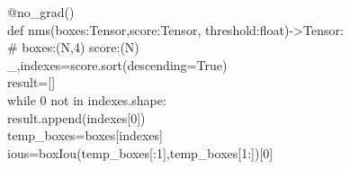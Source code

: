 \begin{frame}
    \large
    @\textcolor{vscodeclass}{no\_grad}\textcolor{vscodebracket}{()}\\
    \vspace{0.2em}
    \textcolor{vscodedef}{def}  \textcolor{vscodefuncation}{nms}\textcolor{vscodebracket}{(}\textcolor{vscodeparameter}{boxes}:\textcolor{vscodeclass}{Tensor},\textcolor{vscodeparameter}{score}:\textcolor{vscodeclass}{Tensor}, \textcolor{vscodeparameter}{threshold}:\textcolor{vscodeclass}{float}\textcolor{vscodebracket}{)}->\textcolor{vscodeclass}{Tensor}:\\
    \vspace{0.2em}
    \qquad\textcolor{vscodecomment}{\# boxes:(N,4) score:(N)}\\
    \vspace{0.2em}
    \qquad\textcolor{vscodeparameter}{\_},\textcolor{vscodeparameter}{indexes}=\textcolor{vscodeparameter}{score}.\textcolor{vscodefuncation}{sort}\textcolor{vscodebracket}{(}\textcolor{vscodeparameter}{descending}=\textcolor{vscodedef}{True}\textcolor{vscodebracket}{)}\\
    \vspace{0.2em}
    \qquad\textcolor{vscodeparameter}{result}=\textcolor{vscodebracket}{[]}\\
    \vspace{0.2em}
    \qquad\textcolor{vscodereturn}{while} \textcolor{vscodecomment}{0} \textcolor{vscodedef}{not in }\textcolor{vscodeparameter}{indexes}.\textcolor{vscodeparameter}{shape}:\\
    \vspace{0.2em}
    \qquad\qquad\textcolor{vscodeparameter}{result}.\textcolor{vscodefuncation}{append}\textcolor{vscodebracket}{(}\textcolor{vscodeparameter}{indexes}\textcolor{vscodecomment}{[0]}\textcolor{vscodebracket}{)}\\
    \vspace{0.2em}
    \qquad\qquad\textcolor{vscodeparameter}{temp\_boxes}=\textcolor{vscodeparameter}{boxes}\textcolor{vscodecomment}{[}\textcolor{vscodeparameter}{indexes}\textcolor{vscodecomment}{]}\\
    \vspace{0.2em}
    \qquad\qquad\textcolor{vscodeparameter}{ious}=\textcolor{vscodefuncation}{boxIou}\textcolor{vscodebracket}{(}\textcolor{vscodeparameter}{temp\_boxes}\textcolor{vscodecomment}{[}:\textcolor{vscodecomment}{1]},\textcolor{vscodeparameter}{temp\_boxes}\textcolor{vscodecomment}{[1}:\textcolor{vscodecomment}{]}\textcolor{vscodebracket}{)[}\textcolor{vscodecomment}{0}\textcolor{vscodebracket}{]}\\

\end{frame}
